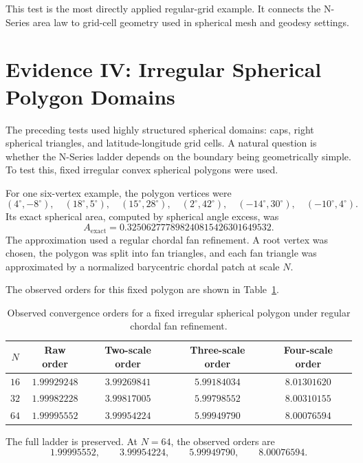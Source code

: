 \documentclass[11pt]{article}
\begin{document}
This test is the most directly applied regular-grid example.  It connects
the N-Series area law to grid-cell geometry used in spherical mesh and
geodesy settings.

\section{Evidence IV: Irregular Spherical Polygon Domains}

The preceding tests used highly structured spherical domains: caps, right
spherical triangles, and latitude-longitude grid cells.  A natural question
is whether the N-Series ladder depends on the boundary being geometrically
simple.  To test this, fixed irregular convex spherical polygons were used.

For one six-vertex example, the polygon vertices were
\[
  (4^\circ,-8^\circ),\quad
  (18^\circ,5^\circ),\quad
  (15^\circ,28^\circ),\quad
  (2^\circ,42^\circ),\quad
  (-14^\circ,30^\circ),\quad
  (-10^\circ,4^\circ).
\]
Its exact spherical area, computed by spherical angle excess, was
\[
  A_{\mathrm{exact}}
  =
  0.325062777898240815426301649532.
\]
The approximation used a regular chordal fan refinement.  A root vertex was
chosen, the polygon was split into fan triangles, and each fan triangle was
approximated by a normalized barycentric chordal patch at scale $N$.

The observed orders for this fixed polygon are shown in
Table~\ref{tab:single-irregular-polygon-orders}.

\begin{table}[ht]
\centering
\small
\begin{tabular}{ccccc}
\toprule
$N$ & Raw order & Two-scale order & Three-scale order & Four-scale order \\
\midrule
$16$ & $1.99929248$ & $3.99269841$ & $5.99184034$ & $8.01301620$ \\
$32$ & $1.99982228$ & $3.99817005$ & $5.99798552$ & $8.00310155$ \\
$64$ & $1.99995552$ & $3.99954224$ & $5.99949790$ & $8.00076594$ \\
\bottomrule
\end{tabular}
\caption{Observed convergence orders for a fixed irregular spherical polygon
under regular chordal fan refinement.}
\label{tab:single-irregular-polygon-orders}
\end{table}

The full ladder is preserved.  At $N=64$, the observed orders are
\[
  1.99995552,\qquad
  3.99954224,\qquad
  5.99949790,\qquad
  8.00076594.
\]
\end{document}
